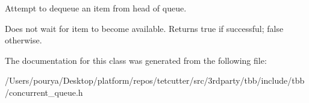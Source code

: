 Attempt to dequeue an item from head of queue. 

Does not wait for item to become available. Returns true if successful; false otherwise. 

The documentation for this class was generated from the following file\+:\begin{DoxyCompactItemize}
\item 
/\+Users/pourya/\+Desktop/platform/repos/tetcutter/src/3rdparty/tbb/include/tbb/concurrent\+\_\+queue.\+h\end{DoxyCompactItemize}
